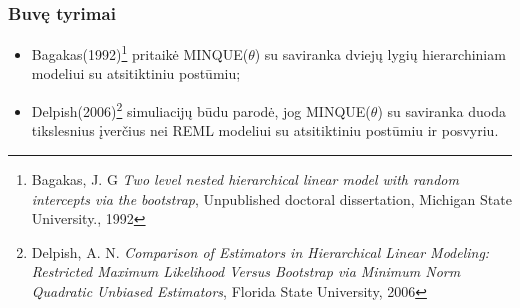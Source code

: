 \documentclass[utf8,hyperref={unicode,pdftex}]{beamer}
\begin{document}

\begin{frame}
\frametitle{Buvę tyrimai}
\begin{itemize}
\item Bagakas(1992)\footnote{Bagakas, J. G  \textit{ Two level nested hierarchical linear model with random intercepts
via the bootstrap}, Unpublished doctoral dissertation, Michigan State University., 1992} pritaikė MINQUE($\theta$) su saviranka dviejų lygių hierarchiniam modeliui su atsitiktiniu postūmiu;
\item Delpish(2006)\footnote{Delpish, A. N.  \textit{Comparison of Estimators in Hierarchical Linear Modeling: Restricted Maximum Likelihood Versus Bootstrap via Minimum Norm Quadratic Unbiased Estimators}, Florida State University, 2006} simuliacijų būdu parodė, jog MINQUE($\theta$) su saviranka duoda tikslesnius įverčius nei REML modeliui su atsitiktiniu postūmiu ir posvyriu.
\end{itemize}
\end{frame}
\end{document}

